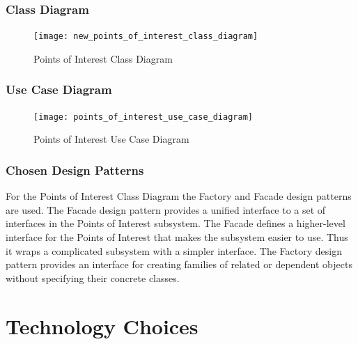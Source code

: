 \documentclass{article}
\begin{document}
        \subsubsection{Class Diagram}
	
	  \begin{figure} [!h]
            \centering
            \texttt{[image: new\_points\_of\_interest\_class\_diagram]}
            \caption{Points of Interest Class Diagram}
            \label{Points of Interest Class Diagram}
        \end{figure}
	
        \subsubsection{Use Case Diagram}
	
	 \begin{figure} [!h]
            \centering
            \texttt{[image: points\_of\_interest\_use\_case\_diagram]}
            \caption{Points of Interest Use Case Diagram}
            \label{Points of Interest Use Case Diagram}
        \end{figure}
	
        \subsubsection{Chosen Design Patterns}
	 For the Points of Interest Class Diagram the Factory and Facade design patterns are used. The Facade design pattern provides a 	 unified interface to a set of interfaces in the Points of Interest subsystem. The Facade defines a higher-level interface for 		 the Points of Interest that makes the subsystem easier to use. Thus it wraps a complicated subsystem with a simpler interface. 	 The Factory design pattern provides an interface for creating families of related or dependent objects without specifying their 	  concrete classes.
	 
\section{Technology Choices}

\end{document}
